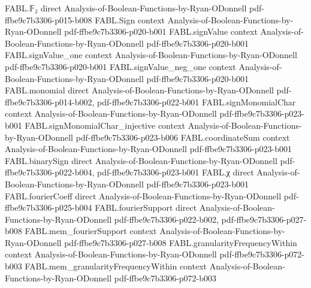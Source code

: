 \begin{theorem}
\label{FABL.widthThreeTseitin_size_le}
\leanok
{}
\proofstep
  {FABL.𝔽₂}
  {direct}
  {Analysis-of-Boolean-Functions-by-Ryan-ODonnell}
  {pdf-ffbe9c7b3306-p015-b008}
\proofstep
  {FABL.Sign}
  {context}
  {Analysis-of-Boolean-Functions-by-Ryan-ODonnell}
  {pdf-ffbe9c7b3306-p020-b001}
\proofstep
  {FABL.signValue}
  {context}
  {Analysis-of-Boolean-Functions-by-Ryan-ODonnell}
  {pdf-ffbe9c7b3306-p020-b001}
\proofstep
  {FABL.signValue_one}
  {context}
  {Analysis-of-Boolean-Functions-by-Ryan-ODonnell}
  {pdf-ffbe9c7b3306-p020-b001}
\proofstep
  {FABL.signValue_neg_one}
  {context}
  {Analysis-of-Boolean-Functions-by-Ryan-ODonnell}
  {pdf-ffbe9c7b3306-p020-b001}
\proofstep
  {FABL.monomial}
  {direct}
  {Analysis-of-Boolean-Functions-by-Ryan-ODonnell}
  {pdf-ffbe9c7b3306-p014-b002,
    pdf-ffbe9c7b3306-p022-b001}
\proofstep
  {FABL.signMonomialChar}
  {context}
  {Analysis-of-Boolean-Functions-by-Ryan-ODonnell}
  {pdf-ffbe9c7b3306-p023-b001}
\proofstep
  {FABL.signMonomialChar_injective}
  {context}
  {Analysis-of-Boolean-Functions-by-Ryan-ODonnell}
  {pdf-ffbe9c7b3306-p023-b006}
\proofstep
  {FABL.coordinateSum}
  {context}
  {Analysis-of-Boolean-Functions-by-Ryan-ODonnell}
  {pdf-ffbe9c7b3306-p023-b001}
\proofstep
  {FABL.binarySign}
  {direct}
  {Analysis-of-Boolean-Functions-by-Ryan-ODonnell}
  {pdf-ffbe9c7b3306-p022-b004,
    pdf-ffbe9c7b3306-p023-b001}
\proofstep
  {FABL.χ}
  {direct}
  {Analysis-of-Boolean-Functions-by-Ryan-ODonnell}
  {pdf-ffbe9c7b3306-p023-b001}
\proofstep
  {FABL.fourierCoeff}
  {direct}
  {Analysis-of-Boolean-Functions-by-Ryan-ODonnell}
  {pdf-ffbe9c7b3306-p025-b004}
\proofstep
  {FABL.fourierSupport}
  {direct}
  {Analysis-of-Boolean-Functions-by-Ryan-ODonnell}
  {pdf-ffbe9c7b3306-p022-b002,
    pdf-ffbe9c7b3306-p027-b008}
\proofstep
  {FABL.mem_fourierSupport}
  {context}
  {Analysis-of-Boolean-Functions-by-Ryan-ODonnell}
  {pdf-ffbe9c7b3306-p027-b008}
\proofstep
  {FABL.granularityFrequencyWithin}
  {context}
  {Analysis-of-Boolean-Functions-by-Ryan-ODonnell}
  {pdf-ffbe9c7b3306-p072-b003}
\proofstep
  {FABL.mem_granularityFrequencyWithin}
  {context}
  {Analysis-of-Boolean-Functions-by-Ryan-ODonnell}
  {pdf-ffbe9c7b3306-p072-b003}

\end{theorem}
